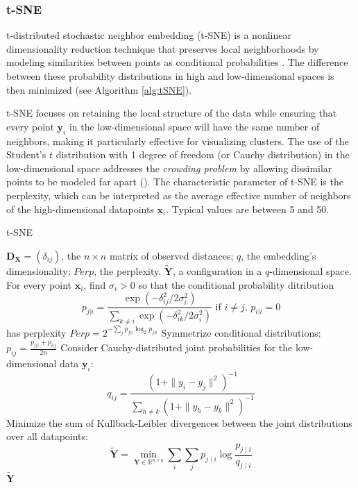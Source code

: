 \subsubsection{t-SNE}

t-distributed stochastic neighbor embedding (t-SNE) is a nonlinear dimensionality reduction technique that preserves local neighborhoods by modeling similarities between points as conditional probabilities \citep{Vandermaaten2008}. The difference between these probability distributions in high and low-dimensional spaces is then minimized (see Algorithm \ref{alg:tSNE}).

t-SNE focuses on retaining the local structure of the data while ensuring that every point $\mathbf{y}_i$ in the low-dimensional space will have the same number of neighbors, making it particularly effective for visualizing clusters. The use of the Student's $t$ distribution with 1 degree of freedom (or Cauchy distribution) in the low-dimensional space addresses the \textit{crowding problem} by allowing dissimilar points to be modeled far apart (\cite{Vandermaaten2008}). The characteristic parameter of t-SNE is the perplexity, which can be interpreted as the average effective number of neighbors of the high-dimensional datapoints $\mathbf{x}_i$. Typical values are between 5 and 50.

\begin{algorithm}
    \caption{t-SNE}
    \label{alg:tSNE}
    
    \begin{algorithmic}[1]
    \REQUIRE $\mathbf{D_X} = (\delta_{ij})$, the $n \times n$ matrix of observed distances; $q$, the embedding's dimensionality; $Perp$, the perplexity.
    \ENSURE $\mathbf{\tilde{Y}}$, a configuration in a $q$-dimensional space.
    \STATE For every point $\mathbf{x}_i$, find $\sigma_i > 0$ so that the conditional probability ditribution
        $$
        p_{j|i} = \frac{\exp(-\delta_{ij}^2/2\sigma_i^2)}{\sum_{k \neq i}\exp(-\delta_{ik}^2/2\sigma_i^2)}\text{ if } i \neq j, \, p_{i|i} = 0
        $$ has perplexity $ Perp = 2^{-\sum_{j} p_{j|i} \log_2 p_{j|i}} $
    \STATE Symmetrize conditional distributions: $p_{ij} = \frac{p_{j|i} + p_{i|j}}{2n}$
    \STATE Consider Cauchy-distributed joint probabilities for the low-dimensional data $\mathbf{y}_i$: $$q_{ij} = \frac{(1 + \|y_i-y_j\|^2)^{-1}}{\sum_{h \neq k}(1 + \|y_h-y_k\|^2)^{-1}}$$
    \STATE Minimize the sum of Kullback-Leibler divergences between the joint distributions over all datapoints: $$
    \mathbf{\tilde{Y}} = \min_{\mathbf{Y} \in \mathbb{R}^{n\times q}} \sum_i \sum_j p_{j \mid i} \log \frac{p_{j \mid i}}{q_{j \mid i}}
    $$
    \RETURN $\mathbf{\tilde{Y}}$
    
    \end{algorithmic}
\end{algorithm}

